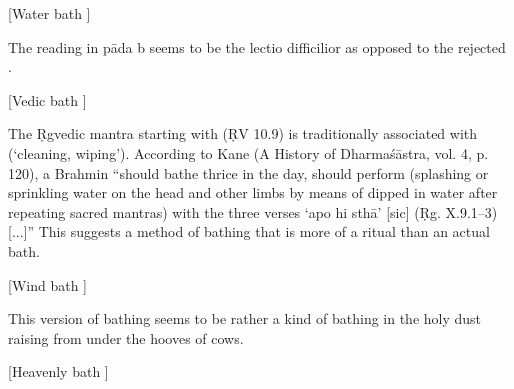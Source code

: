 \begin{center}{{[Water bath
]}}\end{center}




{ The reading  in pāda b seems to be the lectio difficilior as opposed to                 the rejected . }




\begin{center}{{[Vedic bath
]}}\end{center}




{ The Ṛgvedic mantra starting with  (ṚV 10.9) is traditionally associated with                   (`cleaning, wiping'). According to Kane (A History of Dharmaśāstra, vol. 4, p. 120),                 a Brahmin ``should bathe thrice in the day, should perform  (splashing                 or sprinkling water on the head and other limbs by means of                   dipped in water after repeating sacred mantras) with the three verses `apo hi sthā' [sic] (Ṛg. X.9.1--3) [...]''                 This suggests a method of bathing that is more of a ritual than an actual bath. }




\begin{center}{{[Wind bath
]}}\end{center}




{ This version of bathing seems to be rather a kind of bathing                  in the holy dust raising from under the hooves of cows. }




\begin{center}{{[Heavenly bath
]}}\end{center}




